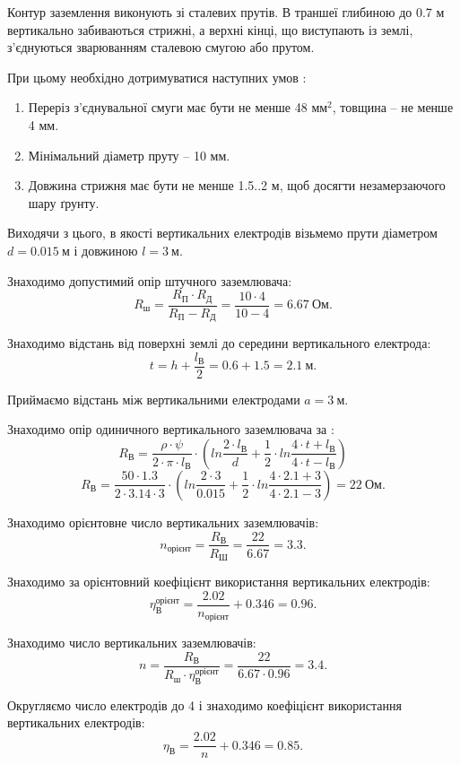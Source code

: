 \documentclass[a4paper,12pt]{article}
\begin{document}
Контур заземлення виконують зі сталевих прутів. В траншеї глибиною до 0.7 м вертикально забиваються стрижні, а верхні кінці, що виступають із землі, з’єднуються зварюванням сталевою смугою або прутом.

При цьому необхідно дотримуватися наступних умов \cite{dzunzuk}:
\begin{enumerate}
\item Переріз з’єднувальної смуги має бути не менше 48 $\text{мм}^2$, товщина -- не менше 4 мм.
\item Мінімальний діаметр пруту -- 10 мм.
\item Довжина стрижня має бути не менше 1.5..2 м, щоб досягти незамерзаючого шару ґрунту.
\end{enumerate}

Виходячи з цього, в якості вертикальних електродів візьмемо прути діаметром $d = 0.015\ \text{м}$ і довжиною $l = 3\ \text{м}$.

Знаходимо допустимий опір штучного заземлювача:
\[
R_\text{ш} = \frac{R_\text{П} \cdot R_\text{Д}}{R_\text{П} - R_\text{Д}} = 
\frac{10 \cdot 4}{10 - 4} = 6.67\ \text{Ом}.
\]

Знаходимо відстань від поверхні землі до середини вертикального електрода:
\[
t = h + \frac{l_\text{В}}{2} = 0.6 + 1.5 = 2.1\ \text{м}.
\]

Приймаємо відстань між вертикальними електродами $a = 3\ \text{м}$.

Знаходимо опір одиничного вертикального заземлювача за \cite{dzunzuk}:
\[
R_\text{В} = \frac{\rho\cdot\psi}{2\cdot\pi\cdot l_\text{В}} \cdot \left( ln \frac{2\cdot l_\text{В}}{d} + \frac{1}{2}\cdot ln \frac{4 \cdot t + l_\text{В}}{4 \cdot t - l_\text{В}} \right)
\]
\[
R_\text{В} = \frac{50\cdot1.3}{2\cdot3.14\cdot 3} \cdot \left( ln \frac{2\cdot 3}{0.015} + \frac{1}{2}\cdot ln \frac{4 \cdot 2.1 + 3}{4 \cdot 2.1 - 3} \right) = 22\ \text{Ом}.
\]

Знаходимо орієнтовне число вертикальних заземлювачів:
\[
n_\text{орієнт} = \frac{R_\text{В}}{R_\text{Ш}} = \frac{22}{6.67} = 3.3.
\]

Знаходимо за \cite{dzunzuk} орієнтовний коефіцієнт використання вертикальних електродів:
\[
\eta_\text{В}^\text{орієнт} = \frac{2.02}{n_\text{орієнт}} + 0.346 = 0.96.
\]

Знаходимо число вертикальних заземлювачів:
\[
n = \frac{R_\text{В}}{R_\text{ш}\cdot \eta_\text{В}^\text{орієнт}} = \frac{22}{6.67\cdot 0.96} = 3.4.
\]

Округляємо число електродів до 4 і знаходимо коефіцієнт використання вертикальних електродів:
\[
\eta_\text{В} = \frac{2.02}{n} + 0.346 = 0.85.
\]
\end{document}
